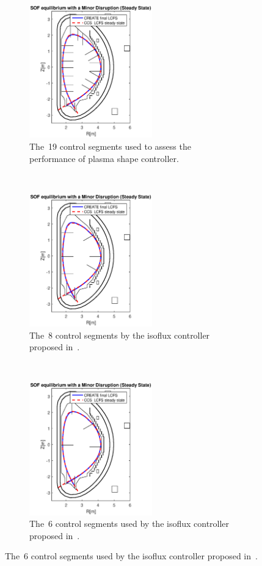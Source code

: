 \begin{figure}[h]
	\centering
	\begin{subfigure}[b]{0.32\textwidth}
		\includegraphics[trim={2.3cm 0 2.3cm 0},clip,height=5.75cm] {Chp3/19_gaps_mnr_disrp_SS_comp.eps}  
		\caption{The~19 control segments used to assess the performance of plasma shape controller.\label{19gaps_isoflux} }
	\end{subfigure}
	~
	\begin{subfigure}[b]{0.32\textwidth}
		\includegraphics[trim={2.3cm 0 2.3cm 0},clip,height=5.75cm]{Chp3/8_gaps_mnr_disrp_SS_comp.eps} 
		\caption{  The~8 control segments by the isoflux controller proposed in~\cite{miyata2013study}. \label{8gaps_isoflux}}
	\end{subfigure}
	~
	\begin{subfigure}[b]{0.32\textwidth}
		\includegraphics [trim={2.3cm 0 2.3cm 0},clip,height=5.75cm]  {Chp3/6_gaps_mnr_disrp_SS_comp.eps} 
		\caption{  The~6 control segments used by the isoflux controller proposed in~\cite{Miyata:2014}.    \label{6gaps_isoflux}}
	\end{subfigure}


\end{figure}
